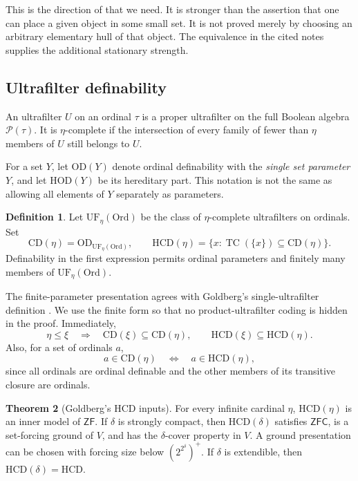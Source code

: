 \documentclass[11pt,letterpaper]{article}
\theoremstyle{definition}
\newtheorem{definition}{Definition}[section]
\newtheorem{theorem}[definition]{Theorem}
\newcommand{\ZFC}{\mathsf{ZFC}}
\newcommand{\ZF}{\mathsf{ZF}}
\newcommand{\HOD}{\mathrm{HOD}}
\newcommand{\OD}{\mathrm{OD}}
\newcommand{\Ord}{\mathrm{Ord}}
\newcommand{\CD}{\mathrm{CD}}
\newcommand{\HCD}{\mathrm{HCD}}
\newcommand{\UF}{\mathrm{UF}}
\newcommand{\Pow}{\mathcal P}
\newcommand{\TC}{\operatorname{TC}}
\numberwithin{equation}{section}
\begin{document}
This is the direction of \cite[Proposition~3.4]{cover} that we need. It is stronger than the assertion that one can place a given object in some small set. It is not proved merely by choosing an arbitrary elementary hull of that object. The equivalence in the cited notes supplies the additional stationary strength.

\subsection{Ultrafilter definability}

An ultrafilter $U$ on an ordinal $\tau$ is a proper ultrafilter on the full Boolean algebra $\Pow(\tau)$. It is $\eta$-complete if the intersection of every family of fewer than $\eta$ members of $U$ still belongs to $U$.

For a set $Y$, let $\OD(Y)$ denote ordinal definability with the \emph{single set parameter} $Y$, and let $\HOD(Y)$ be its hereditary part. This notation is not the same as allowing all elements of $Y$ separately as parameters.

\begin{definition}\label{def:HCD}
Let $\UF_\eta(\Ord)$ be the class of $\eta$-complete ultrafilters on ordinals. Set
\[
 \CD(\eta)=\OD_{\UF_\eta(\Ord)},\qquad
 \HCD(\eta)=\{x:\TC(\{x\})\subseteq\CD(\eta)\}.
\]
Definability in the first expression permits ordinal parameters and finitely many members of $\UF_\eta(\Ord)$.
\end{definition}

The finite-parameter presentation agrees with Goldberg's single-ultrafilter definition \cite[Proposition~4.2]{uniqueness}. We use the finite form so that no product-ultrafilter coding is hidden in the proof. Immediately,
\begin{equation}\label{eq:monotone}
 \eta\leq\xi\quad\Longrightarrow\quad
 \CD(\xi)\subseteq\CD(\eta),\qquad
 \HCD(\xi)\subseteq\HCD(\eta).
\end{equation}
Also, for a set of ordinals $a$,
\begin{equation}\label{eq:ordinalheredity}
 a\in\CD(\eta)\quad\Longleftrightarrow\quad a\in\HCD(\eta),
\end{equation}
since all ordinals are ordinal definable and the other members of its transitive closure are ordinals.

\begin{theorem}[Goldberg's HCD inputs]\label{thm:HCDinputs}
For every infinite cardinal $\eta$, $\HCD(\eta)$ is an inner model of $\ZF$. If $\delta$ is strongly compact, then $\HCD(\delta)$ satisfies $\ZFC$, is a set-forcing ground of $V$, and has the $\delta$-cover property in $V$. A ground presentation can be chosen with forcing size below $(2^{2^\delta})^+$. If $\delta$ is extendible, then $\HCD(\delta)=\HCD$.
\end{theorem}
\end{document}
